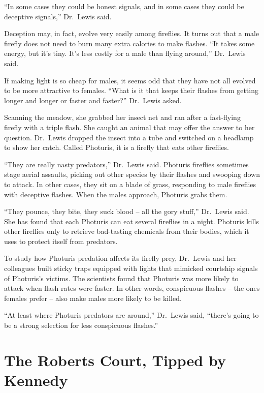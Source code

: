 ﻿\documentclass[12pt]{article}
\begin{document}
``In some cases they could be honest signals, and in some cases they could be deceptive signals,''
Dr.~Lewis said.

Deception may, in fact, evolve very easily among fireflies. It turns out that a male firefly does
not need to burn many extra calories to make flashes. ``It takes some energy, but it's tiny. It's
less costly for a male than flying around,'' Dr.~Lewis said.

If making light is so cheap for males, it seems odd that they have not all evolved to be more
attractive to females. ``What is it that keeps their flashes from getting longer and longer or
faster and faster?'' Dr.~Lewis asked.

Scanning the meadow, she grabbed her insect net and ran after a fast-flying firefly with a triple
flash. She caught an animal that may offer the answer to her question. Dr.~Lewis dropped the insect
into a tube and switched on a headlamp to show her catch. Called Photuris, it is a firefly that eats
other fireflies.

``They are really nasty predators,'' Dr.~Lewis said. Photuris fireflies sometimes stage aerial
assaults, picking out other species by their flashes and swooping down to attack. In other cases,
they sit on a blade of grass, responding to male fireflies with deceptive flashes. When the males
approach, Photuris grabs them.

``They pounce, they bite, they suck blood -- all the gory stuff,'' Dr.~Lewis said. She has found
that each Photuris can eat several fireflies in a night. Photuris kills other fireflies only to
retrieve bad-tasting chemicals from their bodies, which it uses to protect itself from predators.

To study how Photuris predation affects its firefly prey, Dr.~Lewis and her colleagues built sticky
traps equipped with lights that mimicked courtship signals of Photuris's victims. The scientists
found that Photuris was more likely to attack when flash rates were faster. In other words,
conspicuous flashes -- the ones females prefer -- also make males more likely to be killed.

``At least where Photuris predators are around,'' Dr.~Lewis said, ``there's going to be a strong
selection for less conspicuous flashes.''

\section{The Roberts Court, Tipped by Kennedy}
\end{document}
